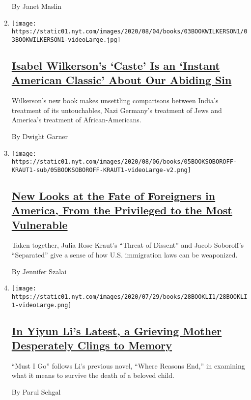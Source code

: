 \begin{enumerate}
  By Janet Maslin
\item
  \texttt{[image: https://static01.nyt.com/images/2020/08/04/books/03BOOKWILKERSON1/03BOOKWILKERSON1-videoLarge.jpg]}

  \hypertarget{isabel-wilkersons-caste-is-an-instant-american-classic-about-our-abiding-sin}{%
  \subsection{\texorpdfstring{\href{/2020/07/31/books/review-caste-isabel-wilkerson-origins-of-our-discontents.html}{Isabel
  Wilkerson's `Caste' Is an `Instant American Classic' About Our Abiding
  Sin}}{Isabel Wilkerson's `Caste' Is an `Instant American Classic' About Our Abiding Sin}}\label{isabel-wilkersons-caste-is-an-instant-american-classic-about-our-abiding-sin}}

  Wilkerson's new book makes unsettling comparisons between India's
  treatment of its untouchables, Nazi Germany's treatment of Jews and
  America's treatment of African-Americans.

  By Dwight Garner
\item
  \texttt{[image: https://static01.nyt.com/images/2020/08/06/books/05BOOKSOBOROFF-KRAUT1-sub/05BOOKSOBOROFF-KRAUT1-videoLarge-v2.png]}

  \hypertarget{new-looks-at-the-fate-of-foreigners-in-america-from-the-privileged-to-the-most-vulnerable}{%
  \subsection{\texorpdfstring{\href{/2020/07/30/books/review-threat-dissent-julia-rose-kraut-separated-jacob-soboroff.html}{New
  Looks at the Fate of Foreigners in America, From the Privileged to the
  Most
  Vulnerable}}{New Looks at the Fate of Foreigners in America, From the Privileged to the Most Vulnerable}}\label{new-looks-at-the-fate-of-foreigners-in-america-from-the-privileged-to-the-most-vulnerable}}

  Taken together, Julia Rose Kraut's ``Threat of Dissent'' and Jacob
  Soboroff's ``Separated'' give a sense of how U.S. immigration laws can
  be weaponized.

  By Jennifer Szalai
\item
  \texttt{[image: https://static01.nyt.com/images/2020/07/29/books/28BOOKLI1/28BOOKLI1-videoLarge.png]}

  \hypertarget{in-yiyun-lis-latest-a-grieving-mother-desperately-clings-to-memory}{%
  \subsection{\texorpdfstring{\href{/2020/07/28/books/review-must-i-go-yiyun-li.html}{In
  Yiyun Li's Latest, a Grieving Mother Desperately Clings to
  Memory}}{In Yiyun Li's Latest, a Grieving Mother Desperately Clings to Memory}}\label{in-yiyun-lis-latest-a-grieving-mother-desperately-clings-to-memory}}

  ``Must I Go'' follows Li's previous novel, ``Where Reasons End,'' in
  examining what it means to survive the death of a beloved child.

  By Parul Sehgal
\end{enumerate}

